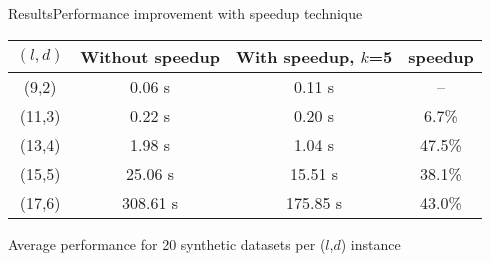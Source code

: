 \documentclass[pdf,xcolor={dvipsnames}]{beamer}
\begin{document}
	\begin{frame}{Results}{Performance improvement with speedup technique}
		\begin{table}[h] %
			\small
			\renewcommand{\arraystretch}{1.3}
			\label{tbl:speedup_blockmasking}
			\centering
			\begin{tabular}{|c|c|c|c|}
			\hline 
			\bfseries\boldmath $(l,d)$ & \bfseries Without speedup & \bfseries With speedup, $k$=5 & \bfseries speedup\\
			\hline
			 (9,2) &   0.06 s &    0.11 s &     --  \\
			(11,3) &   0.22 s &    0.20 s &    6.7\%\\
			(13,4) &   1.98 s &    1.04 s &   47.5\%\\
			(15,5) &  25.06 s &   15.51 s &   38.1\%\\
			(17,6) & 308.61 s &  175.85 s &   43.0\%\\
			\hline\end{tabular}
			\end{table}

		{\centering \footnotesize Average performance for 20 synthetic datasets per ($l$,$d$) instance \\}
		\end{frame}
\end{document}
